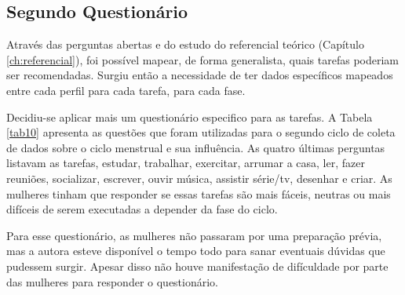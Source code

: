 \subsection{Segundo Questionário}
Através das perguntas abertas e do estudo do referencial teórico (Capítulo \ref{ch:referencial}), 
foi possível mapear, de forma generalista, quais tarefas poderiam ser 
recomendadas. Surgiu então a necessidade de ter dados específicos mapeados entre cada perfil para cada tarefa, 
para cada fase. 

Decidiu-se aplicar mais um questionário especifico para as tarefas.
A Tabela \ref{tab10} apresenta as questões que foram utilizadas para o segundo ciclo de coleta 
de dados sobre o ciclo menstrual e 
sua influência. As quatro últimas perguntas listavam as tarefas, estudar, trabalhar, exercitar, arrumar a casa, 
ler, fazer reuniões, socializar, escrever, ouvir música, assistir série/tv, desenhar e criar. As 
mulheres tinham que responder se essas tarefas são mais fáceis, neutras ou mais difíceis de serem executadas 
a depender da fase do ciclo. 

Para esse questionário, as mulheres não passaram por uma preparação prévia, mas a autora esteve disponível o tempo 
todo para sanar eventuais dúvidas que pudessem surgir. Apesar disso não houve manifestação de difículdade por parte das mulheres 
para responder o questionário.

